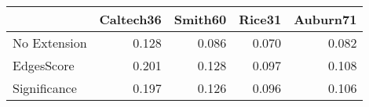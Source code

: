 \begin{tabular}{lrrrr}
\toprule
{} & Caltech36 & Smith60 & Rice31 & Auburn71 \\
\midrule
No Extension &     0.128 &   0.086 &  0.070 &    0.082 \\
EdgesScore   &     0.201 &   0.128 &  0.097 &    0.108 \\
Significance &     0.197 &   0.126 &  0.096 &    0.106 \\
\bottomrule
\end{tabular}
